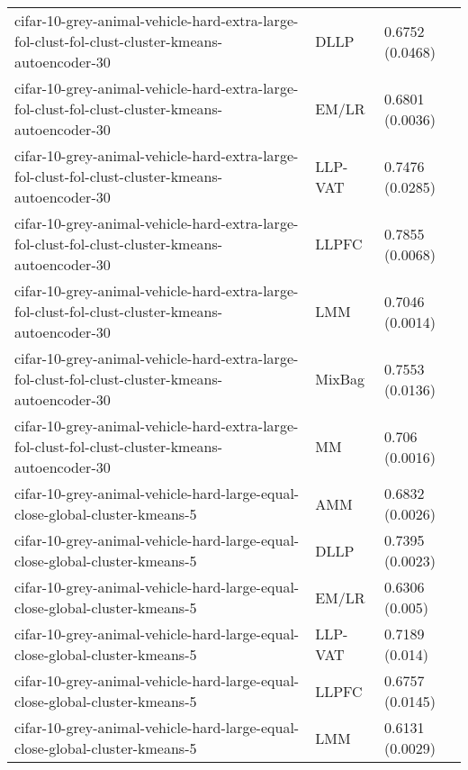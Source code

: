 \begin{longtable}{lll}
              cifar-10-grey-animal-vehicle-hard-extra-large-fol-clust-fol-clust-cluster-kmeans-autoencoder-30 &      DLLP &                           0.6752 (0.0468) \\
              cifar-10-grey-animal-vehicle-hard-extra-large-fol-clust-fol-clust-cluster-kmeans-autoencoder-30 &     EM/LR &                           0.6801 (0.0036) \\
              cifar-10-grey-animal-vehicle-hard-extra-large-fol-clust-fol-clust-cluster-kmeans-autoencoder-30 &   LLP-VAT &                           0.7476 (0.0285) \\
              cifar-10-grey-animal-vehicle-hard-extra-large-fol-clust-fol-clust-cluster-kmeans-autoencoder-30 &     LLPFC &                           0.7855 (0.0068) \\
              cifar-10-grey-animal-vehicle-hard-extra-large-fol-clust-fol-clust-cluster-kmeans-autoencoder-30 &       LMM &                           0.7046 (0.0014) \\
              cifar-10-grey-animal-vehicle-hard-extra-large-fol-clust-fol-clust-cluster-kmeans-autoencoder-30 &    MixBag &                           0.7553 (0.0136) \\
              cifar-10-grey-animal-vehicle-hard-extra-large-fol-clust-fol-clust-cluster-kmeans-autoencoder-30 &        MM &                            0.706 (0.0016) \\
                                  cifar-10-grey-animal-vehicle-hard-large-equal-close-global-cluster-kmeans-5 &       AMM &                           0.6832 (0.0026) \\
                                  cifar-10-grey-animal-vehicle-hard-large-equal-close-global-cluster-kmeans-5 &      DLLP &                           0.7395 (0.0023) \\
                                  cifar-10-grey-animal-vehicle-hard-large-equal-close-global-cluster-kmeans-5 &     EM/LR &                            0.6306 (0.005) \\
                                  cifar-10-grey-animal-vehicle-hard-large-equal-close-global-cluster-kmeans-5 &   LLP-VAT &                            0.7189 (0.014) \\
                                  cifar-10-grey-animal-vehicle-hard-large-equal-close-global-cluster-kmeans-5 &     LLPFC &                           0.6757 (0.0145) \\
                                  cifar-10-grey-animal-vehicle-hard-large-equal-close-global-cluster-kmeans-5 &       LMM &                           0.6131 (0.0029) \\

\end{longtable}
